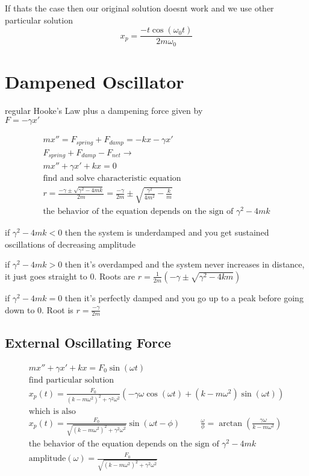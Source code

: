 \documentclass[fleqn]{report}
\newcommand{\hp}{\hspace{1cm}}
\newcommand{\equations} [1] {
\begin{gather*}
#1
\end{gather*}
}
\begin{document}
 If thats the case then our original solution doesnt work and we use other particular solution
 \[
 x_p = \frac{ -t \cos ( \omega_0 t)}{2m \omega_0}
 \]
 
 
 
 
 \section{Dampened Oscillator}
 regular Hooke's Law plus a dampening force given by \\ $F =  -\gamma x'$
 \equations{
mx'' = F_{spring} + F_{damp} = -kx  - \gamma x'
 \\
 F_{spring} + F_{damp} - F_{net} \rightarrow  
 \\
mx'' + \gamma x' + kx = 0
\\
\textrm{find and solve characteristic equation}
\\
r = \frac{ - \gamma \pm \sqrt{ \gamma^2 - 4 m k} } {2m} = 
\frac{- \gamma }{2m} \pm \sqrt{ \frac{ \gamma^2}{4m^2} - \frac{k}{m}}
\\
\textrm{the behavior of the equation depends on the sign of $\gamma^2 - 4mk$}
}

if $\gamma^2 - 4mk < 0$ then the system is underdamped and you get sustained oscillations of decreasing amplitude

if $\gamma^2 - 4mk > 0$ then it's overdamped and the system never increases in distance, it just goes straight to 0.
Roots are $r = \frac{1}{2m} ( -\gamma \pm \sqrt{\gamma^2 - 4km} )$

if $\gamma^2 - 4mk = 0$ then it's perfectly damped and you go up to a peak before going down to 0.
Root is $r = \frac{- \gamma}{2m}$

\subsection{External Oscillating Force}
 \equations{
mx'' + \gamma x' + kx = F_0 \sin (\omega t)
\\
\textrm{find particular solution}
\\
x_p (t) = \frac{F_0}{(k - m \omega^2)^2 + \gamma^2 \omega^2}
(- \gamma \omega \cos (\omega t) + (k - m \omega^2) \sin ( \omega t))
\\
\textrm{which is also}
\\
x_p (t) = \frac{F_0}{ \sqrt{(k - m \omega^2)^2 + \gamma^2 \omega^2}}
\sin (\omega t - \phi)
\hp
\frac{\omega}{\phi} = \arctan (\frac{ \gamma \omega}{k - m \omega^2} )
\\
\textrm{the behavior of the equation depends on the sign of $\gamma^2 - 4mk$}
\\
\textrm{amplitude}(\omega) = \frac{F_0}{\sqrt{(k - m \omega^2)^2 + \gamma^2 \omega^2}}
}
\end{document}
